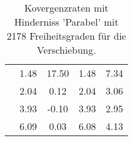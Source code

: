 \begin{table}
\begin{tabular}{c|cc|cc|}
\multicolumn{1}{|c|}{} & \multicolumn{1}{|c|}{      1.48} & \multicolumn{1}{|c|}{     17.50} & \multicolumn{1}{|c|}{      1.48} & \multicolumn{1}{|c|}{      7.34} \\ 
\multicolumn{1}{|c|}{} & \multicolumn{1}{|c|}{      2.04} & \multicolumn{1}{|c|}{      0.12} & \multicolumn{1}{|c|}{      2.04} & \multicolumn{1}{|c|}{      3.06} \\ 
\multicolumn{1}{|c|}{} & \multicolumn{1}{|c|}{      3.93} & \multicolumn{1}{|c|}{     -0.10} & \multicolumn{1}{|c|}{      3.93} & \multicolumn{1}{|c|}{      2.95} \\ 
\multicolumn{1}{|c|}{} & \multicolumn{1}{|c|}{      6.09} & \multicolumn{1}{|c|}{      0.03} & \multicolumn{1}{|c|}{      6.08} & \multicolumn{1}{|c|}{      4.13} \\ 
\hline 
\end{tabular}\caption{Kovergenzraten mit Hinderniss 'Parabel' mit 2178 Freiheitsgraden für die Verschiebung.}\label{tab:Rate_Parabel_level4}
\end{table} 
